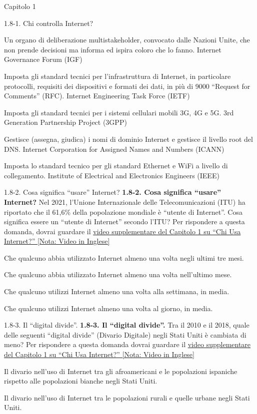 \documentclass[a4paper]{article}
\begin{document}
\begin{quiz}{Capitolo 1}
\begin{matching}[points=1,shuffle=true]{1.8-1. Chi controlla Internet?}
\item Un organo di deliberazione multistakeholder, convocato dalle Nazioni Unite, che non prende decisioni ma informa ed ispira coloro che lo fanno. \answer Internet Governance Forum (IGF)
\item Imposta gli standard tecnici per l'infrastruttura di Internet, in particolare protocolli, requisiti dei dispositivi e formati dei dati, in più di 9000 ``Request for Comments'' (RFC). \answer Internet Engineering Task Force (IETF)
\item Imposta gli standard tecnici per i sistemi cellulari mobili 3G, 4G e 5G. \answer 3rd Generation Partnership Project (3GPP)
\item Gestisce (assegna, giudica) i nomi di dominio Internet e gestisce il livello root del DNS. \answer Internet Corporation for Assigned Names and Numbers (ICANN)
\item Imposta lo standard tecnico per gli standard Ethernet e WiFi a livello di collegamento. \answer Institute of Electrical and Electronics Engineers (IEEE)
\end{matching}

\begin{multi}[points=1,shuffle=true]{1.8-2. Cosa significa ``usare'' Internet?}
\textbf{1.8-2. Cosa significa ``usare'' Internet?}
Nel 2021, l'Unione Internazionale delle Telecomunicazioni (ITU) ha riportato che il 61,6\% della popolazione mondiale è ``utente di Internet''. Cosa significa essere un ``utente di Internet'' secondo l'ITU?
Per rispondere a questa domanda, dovrai guardare il \href{https://www.youtube.com/watch?v=-YaGGf8C1A4}{video supplementare del Capitolo 1 su ``Chi Usa Internet?'' [Nota: Video in Inglese]}
\item* Che qualcuno abbia utilizzato Internet almeno una volta negli ultimi tre mesi.
\item Che qualcuno abbia utilizzato Internet almeno una volta nell'ultimo mese.
\item Che qualcuno utilizzi Internet almeno una volta alla settimana, in media.
\item Che qualcuno utilizzi Internet almeno una volta al giorno, in media.
\end{multi}

\begin{multi}[points=1,shuffle=true]{1.8-3. Il ``digital divide''.}
\textbf{1.8-3. Il ``digital divide''.}
Tra il 2010 e il 2018, quale delle seguenti ``digital divide'' (Divario Digitale) negli Stati Uniti è cambiata di meno?
Per rispondere a questa domanda dovrai guardare il \href{https://www.youtube.com/watch?v=-YaGGf8C1A4}{video supplementare del Capitolo 1 su ``Chi Usa Internet?'' [Nota: Video in Inglese]}
\item* Il divario nell'uso di Internet tra gli afroamericani e le popolazioni ispaniche rispetto alle popolazioni bianche negli Stati Uniti.
\item Il divario nell'uso di Internet tra le popolazioni rurali e quelle urbane negli Stati Uniti.
\end{multi}

\end{quiz}
\end{document}
